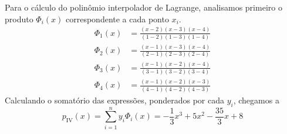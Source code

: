 \documentclass{homework}
\begin{document}
	
	\quest%
	
	Para o cálculo do polinômio interpolador de Lagrange, analisamos primeiro o produto $\varPhi_i(x)$ correspondente a cada ponto $x_i$.
		\begin{align*}
		\varPhi_1(x) &= \frac{(x - 2) (x - 3) (x - 4)}{(1 - 2) (1 - 3) (1 - 4)}\\
		\varPhi_2(x) &= \frac{(x - 1) (x - 3) (x - 4)}{(2 - 1) (2 - 3) (2 - 4)}\\
		\varPhi_3(x) &= \frac{(x - 1) (x - 2) (x - 4)}{(3 - 1) (3 - 2) (3 - 4)}\\
		\varPhi_4(x) &= \frac{(x - 1) (x - 2) (x - 3)}{(4 - 1) (4 - 2) (4 - 3)}
		\end{align*}%
	Calculando o somatório das expressões, ponderados por cada $y_i$, chegamos a
		$$p_\text{IV}(x) = \sum_{i=1}^{n} y_i \varPhi_i(x) = -\frac{1}{3} x^3 + 5 x^2  -\frac{35}{3} x + 8$$
	
	\quest%
	
\end{document}

